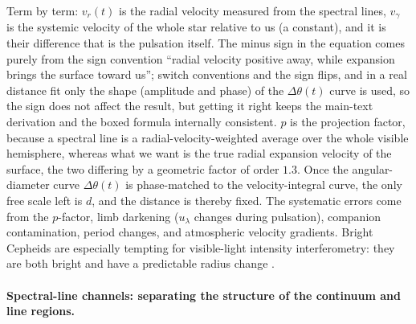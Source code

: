 Term by term: \(v_r(t)\) is the radial velocity measured from the spectral lines, \(v_\gamma\) is the systemic velocity of the whole star relative to us (a constant), and it is their difference that is the pulsation itself. The minus sign in the equation comes purely from the sign convention ``radial velocity positive away, while expansion brings the surface toward us''; switch conventions and the sign flips, and in a real distance fit only the shape (amplitude and phase) of the \(\Delta\theta(t)\) curve is used, so the sign does not affect the result, but getting it right keeps the main-text derivation and the boxed formula internally consistent. \(p\) is the projection factor, because a spectral line is a radial-velocity-weighted average over the whole visible hemisphere, whereas what we want is the true radial expansion velocity of the surface, the two differing by a geometric factor of order \(1.3\). Once the angular-diameter curve \(\Delta\theta(t)\) is phase-matched to the velocity-integral curve, the only free scale left is \(d\), and the distance is thereby fixed. The systematic errors come from the \(p\)-factor, limb darkening (\(u_\lambda\) changes during pulsation), companion contamination, period changes, and atmospheric velocity gradients. Bright Cepheids are especially tempting for visible-light intensity interferometry: they are both bright and have a predictable radius change \citep{1997A&A...320..799F,2007A&A...476...73F}.

\paragraph{Spectral-line channels: separating the structure of the continuum and line regions.}
\label{sec:e17-line}

